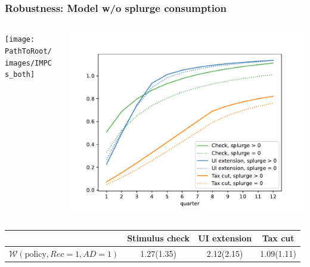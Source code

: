 \documentclass[pdflatex,aspectratio=169]{beamer}
\begin{document}
\begin{frame}
  \frametitle{Robustness: Model w/o splurge consumption}
  \begin{columns}
    \begin{column}{0.5\textwidth}
      \texttt{[image: \\PathToRoot/images/IMPCs\_both]}
    \end{column}
    \begin{column}{0.5\textwidth}
      \includegraphics[width=\linewidth]{Code/HA-Models/FromPandemicCode/Figures/Splurge0/Cumulative_multipliers_SplurgeComp}
    \end{column}
  \end{columns}
  \begin{center}
    \begin{tabular}
      {@{}lccc@{}}
      \hline
                                                & Stimulus check & UI extension & Tax cut    \\  \hline
      $\mathcal{W}(\text{policy}, Rec=1, AD=1)$ & 1.27(1.35)     & 2.12(2.15)   & 1.09(1.11) \\ \hline
    \end{tabular}
  \end{center}
\end{frame}
\end{document}
